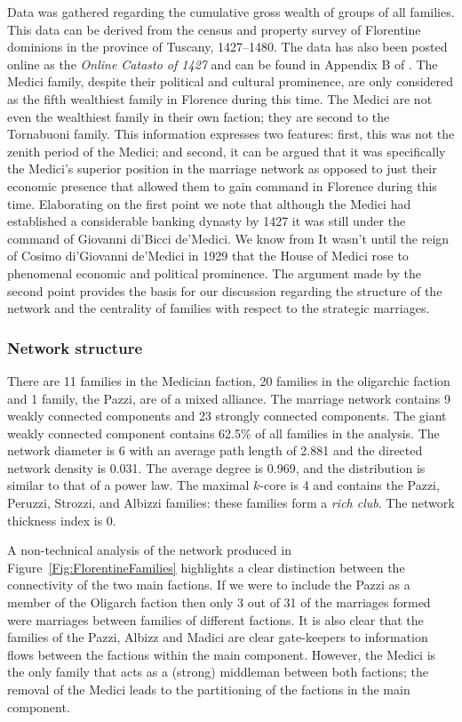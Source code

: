 \documentclass[11pt,fleqn]{article}
\begin{document}
Data was gathered regarding the cumulative gross wealth of groups of all families. This data can be derived from the census and property survey of Florentine dominions in the province of Tuscany, 1427--1480. The data has also been posted online as the \emph{Online Catasto of 1427} and can be found in Appendix B of \citet{Padgett1993}. The Medici family, despite their political and cultural prominence, are only considered as the fifth wealthiest family in Florence during this time. The Medici are not even the wealthiest family in their own faction; they are second to the Tornabuoni family. This information expresses two features: first, this was not the zenith period of the Medici; and second, it can be argued that it was specifically the Medici's superior position in the marriage network as opposed to just their economic presence that allowed them to gain command in Florence during this time. Elaborating on the first point we note that although the Medici had established a considerable banking dynasty by 1427 it was still under the command of Giovanni di'Bicci de'Medici. We know from  It wasn't until the reign of Cosimo di'Giovanni de'Medici in 1929 that the House of Medici rose to phenomenal economic and political prominence. The argument made by the second point provides the basis for our discussion regarding the structure of the network and the centrality of families with respect to the strategic marriages.

\subsubsection{Network structure}

There are 11 families in the Medician faction, 20 families in the oligarchic faction and 1 family, the Pazzi, are of a mixed alliance. The marriage network contains 9 weakly connected components and 23 strongly connected components. The giant weakly connected component contains 62.5\% of all families in the analysis. The network diameter is 6 with an average path length of 2.881 and the directed network density is 0.031. The average degree is 0.969, and the distribution is similar to that of a power law. The maximal $k$-core is 4 and contains the Pazzi, Peruzzi, Strozzi, and Albizzi families: these families form a \emph{rich club}. The network thickness index is 0.

A non-technical analysis of the network produced in Figure~\ref{Fig:FlorentineFamilies} highlights a clear distinction between the connectivity of the two main factions. If we were to include the Pazzi as a member of the Oligarch faction then only 3 out of 31 of the marriages formed were marriages between families of different factions. It is also clear that the families of the Pazzi, Albizz and Madici are clear gate-keepers to information flows between the factions within the main component. However, the Medici is the only family that acts as a (strong) middleman between both factions; the removal of the Medici leads to the partitioning of the factions in the main component.
\end{document}
